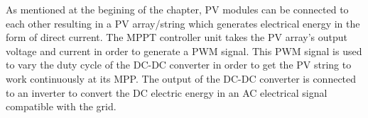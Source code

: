 As mentioned at the begining of the chapter, PV modules can be connected to each other resulting in a PV array/string which generates electrical energy in the form of direct current. The MPPT controller unit takes the PV array's output voltage and current in order to generate a PWM signal. This PWM signal is used to vary the duty cycle of the DC-DC converter in order to get the PV string to work continuously at its MPP. The output of the DC-DC converter is connected to an inverter to convert the DC electric energy in an AC electrical signal compatible with the grid. 

